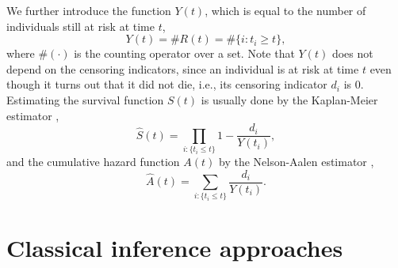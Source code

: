 We further introduce the function $Y(t)$, which is equal to the number of individuals still at risk at time $t$,
\begin{equation*}
    Y(t)=\#R(t)=\#\{i\colon t_i\geq t\},
\end{equation*}
where $\#(\cdot)$ is the counting operator over a set. Note that $Y(t)$ does not depend on the censoring indicators, since
an individual is at risk at time $t$ even though it turns out that it did not die, i.e., its censoring indicator $d_i$ is 0.
Estimating the survival function $S(t)$ is usually done by the Kaplan-Meier estimator \citep{kaplan-meier},
\begin{equation*}
    \hat{S}(t)=\prod_{i:\{t_i\leq t\}}1-\frac{d_i}{Y(t_i)},
\end{equation*}
and the cumulative hazard function $A(t)$ by the Nelson-Aalen estimator \citep{nelson, aalen1978},
\begin{equation*}
    \hat{A}(t)=\sum_{i:\{t_i\leq t\}}\frac{d_i}{Y(t_i)}.
\end{equation*}

\section{Classical inference approaches}
